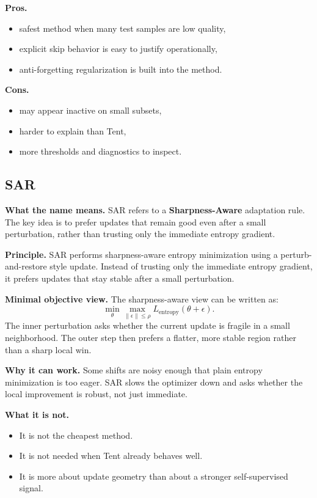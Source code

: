 \textbf{Pros.}
\begin{itemize}
  \item safest method when many test samples are low quality,
  \item explicit skip behavior is easy to justify operationally,
  \item anti-forgetting regularization is built into the method.
\end{itemize}

\textbf{Cons.}
\begin{itemize}
  \item may appear inactive on small subsets,
  \item harder to explain than Tent,
  \item more thresholds and diagnostics to inspect.
\end{itemize}

\subsection{SAR}
\textbf{What the name means.}
SAR refers to a \textbf{Sharpness-Aware} adaptation rule.
The key idea is to prefer updates that remain good even after a small perturbation, rather than trusting only the immediate entropy gradient.

\textbf{Principle.}
SAR performs sharpness-aware entropy minimization using a perturb-and-restore style update. Instead of trusting only the immediate entropy gradient, it prefers updates that stay stable after a small perturbation.

\textbf{Minimal objective view.}
The sharpness-aware view can be written as:
\[
\min_{\theta} \max_{\left\| \epsilon \right\| \leq \rho} L_{\mathrm{entropy}}(\theta + \epsilon).
\]
The inner perturbation asks whether the current update is fragile in a small neighborhood.
The outer step then prefers a flatter, more stable region rather than a sharp local win.

\textbf{Why it can work.}
Some shifts are noisy enough that plain entropy minimization is too eager.
SAR slows the optimizer down and asks whether the local improvement is robust, not just immediate.

\textbf{What it is not.}
\begin{itemize}
  \item It is not the cheapest method.
  \item It is not needed when Tent already behaves well.
  \item It is more about update geometry than about a stronger self-supervised signal.
\end{itemize}

